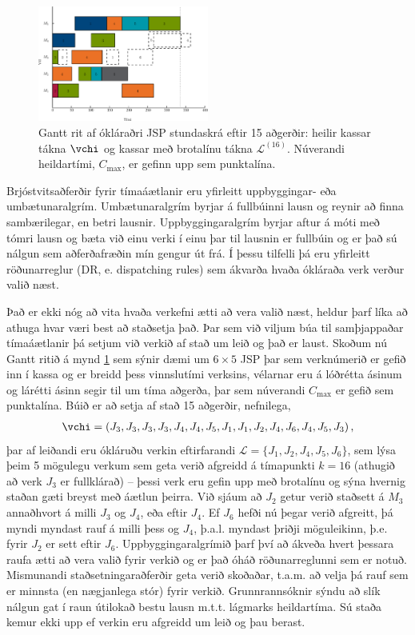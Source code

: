 \documentclass[10pt,a4paper]{article}
\begin{document}
\begin{figure}\centering
    \includegraphics[width=0.5\textwidth]{figures/jssp_example.eps}
    \caption[Gantt rit af ókláraðri JSP stundaskrá]{Gantt rit af ókláraðri JSP 
    stundaskrá eftir 15 aðgerðir: heilir kassar tákna $\vchi$ og kassar með 
    brotalínu tákna $\mathcal{L}^{(16)}$. 
    Núverandi heildartími, $C_{\max}$, er gefinn upp sem punktalína.}
    \label{fig:jssp:example}
\end{figure}

Brjóstvitsaðferðir fyrir tímaáætlanir eru yfirleitt uppbyggingar- eða 
umbætunaralgrím.
Umbætunaralgrím byrjar á fullbúinni lausn og reynir að finna sambærilegar, en 
betri lausnir. 
Uppbyggingaralgrím byrjar aftur á móti með tómri lausn og bæta við einu verki í 
einu þar til lausnin er fullbúin og er það sú nálgun sem aðferðafræðin mín 
gengur út frá. 
Í þessu tilfelli þá eru yfirleitt röðunarreglur (DR, e. dispatching 
rules) sem ákvarða hvaða ókláraða verk verður valið næst. 

Það er ekki nóg að vita hvaða verkefni ætti að vera valið næst, 
heldur þarf líka að athuga hvar væri best að staðsetja það. 
Þar sem við viljum búa til samþjappaðar tímaáætlanir  þá setjum við verkið af 
stað um leið og það er laust. 
Skoðum nú Gantt ritið á mynd \ref{fig:jssp:example} sem sýnir dæmi um 
$6\times5$ JSP þar sem verknúmerið er gefið inn í kassa og er breidd þess 
vinnslutími verksins, 
vélarnar eru á lóðrétta ásinum og lárétti ásinn segir til um tíma aðgerða,
þar sem núverandi $C_{\max}$ er gefið sem punktalína. 
Búið er að setja af stað 15 aðgerðir, nefnilega, 
\begin{eqnarray}
\vchi=\left(J_3,J_3,J_3,J_3,J_4,J_4,J_5,J_1,J_1,J_2,J_4,J_6,J_4,J_5,J_3\right),
\end{eqnarray}
þar af leiðandi eru ókláruðu verkin eftirfarandi 
$\mathcal{L}=\{J_1,J_2,J_4,J_5,J_6\}$, sem lýsa þeim 5 mögulegu verkum sem geta 
verið afgreidd á tímapunkti $k=16$ (athugið að verk $J_3$ er fullklárað) -- 
þessi verk eru gefin upp með brotalínu og sýna hvernig staðan gæti breyst með 
áætlun þeirra. 
Við sjáum að $J_2$ getur verið staðsett á $M_3$ annaðhvort á milli  $J_3$ og 
$J_4$, eða eftir $J_4$.  Ef $J_6$ hefði nú þegar verið afgreitt, þá myndi 
myndast rauf á milli þess og $J_4$, þ.a.l. myndast þriðji möguleikinn, þ.e. 
fyrir $J_2$ er sett eftir $J_6$. 
Uppbyggingaralgrímið þarf því að ákveða hvert þessara raufa ætti að vera 
valið fyrir verkið og er það óháð röðunarreglunni sem er notuð. 
Mismunandi staðsetningaraðferðir geta verið skoðaðar, t.a.m. að velja þá rauf 
sem er minnsta (en nægjanlega stór) fyrir verkið. Grunnrannsóknir sýndu að 
slík nálgun gat í raun útilokað bestu lausn m.t.t. lágmarks heildartíma. 
Sú staða kemur ekki upp ef verkin eru afgreidd um leið og þau berast. 
\end{document}
